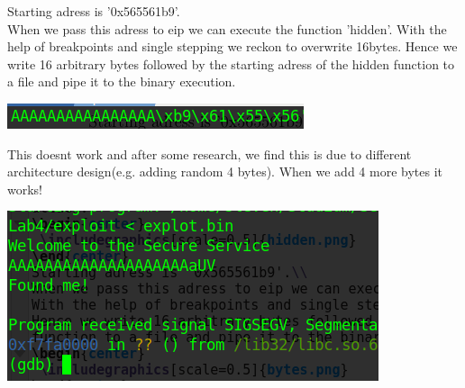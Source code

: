 \documentclass[a4paper,10pt]{article}
\begin{document}
Starting adress is '0x565561b9'.\\
When we pass this adress to eip we can execute the function 'hidden'.
With the help of breakpoints and single stepping we reckon to overwrite 16bytes.
Hence we write 16 arbitrary bytes followed by the starting adress of the hidden function to a file and pipe it to the binary execution. 
\begin{center}
 \includegraphics[scale=0.5]{bytes.png}
\end{center}
This doesnt work and after some research, we find this is due to different architecture design(e.g. adding random 4 bytes). When we add 4 more bytes it works!
\begin{center}
 \includegraphics[scale=0.5]{found.png}
\end{center}
\end{document}

